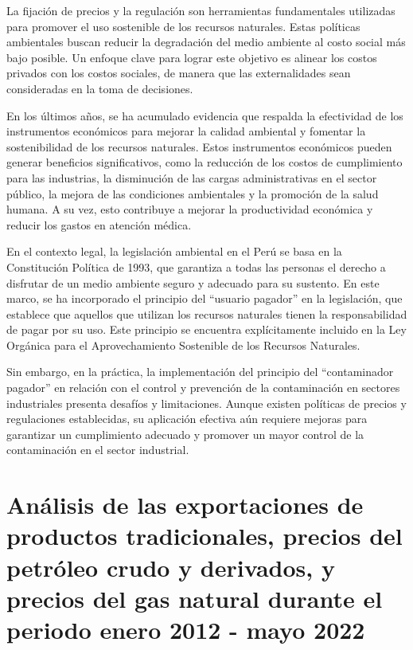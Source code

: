 \documentclass[
  stu,
  floatsintext,
  longtable,
  a4paper,
  nolmodern,
  notxfonts,
  notimes,
  12pt,
  colorlinks=true,linkcolor=blue,citecolor=blue,urlcolor=blue]{apa7}
\begin{document}
La fijación de precios y la regulación son herramientas fundamentales
utilizadas para promover el uso sostenible de los recursos naturales.
Estas políticas ambientales buscan reducir la degradación del medio
ambiente al costo social más bajo posible. Un enfoque clave para lograr
este objetivo es alinear los costos privados con los costos sociales, de
manera que las externalidades sean consideradas en la toma de
decisiones.

En los últimos años, se ha acumulado evidencia que respalda la
efectividad de los instrumentos económicos para mejorar la calidad
ambiental y fomentar la sostenibilidad de los recursos naturales. Estos
instrumentos económicos pueden generar beneficios significativos, como
la reducción de los costos de cumplimiento para las industrias, la
disminución de las cargas administrativas en el sector público, la
mejora de las condiciones ambientales y la promoción de la salud humana.
A su vez, esto contribuye a mejorar la productividad económica y reducir
los gastos en atención médica.

En el contexto legal, la legislación ambiental en el Perú se basa en la
Constitución Política de 1993, que garantiza a todas las personas el
derecho a disfrutar de un medio ambiente seguro y adecuado para su
sustento. En este marco, se ha incorporado el principio del ``usuario
pagador'' en la legislación, que establece que aquellos que utilizan los
recursos naturales tienen la responsabilidad de pagar por su uso. Este
principio se encuentra explícitamente incluido en la Ley Orgánica para
el Aprovechamiento Sostenible de los Recursos Naturales.

Sin embargo, en la práctica, la implementación del principio del
``contaminador pagador'' en relación con el control y prevención de la
contaminación en sectores industriales presenta desafíos y limitaciones.
Aunque existen políticas de precios y regulaciones establecidas, su
aplicación efectiva aún requiere mejoras para garantizar un cumplimiento
adecuado y promover un mayor control de la contaminación en el sector
industrial.

\section{Análisis de las exportaciones de productos tradicionales,
precios del petróleo crudo y derivados, y precios del gas natural
durante el periodo enero 2012 - mayo
2022}\label{anuxe1lisis-de-las-exportaciones-de-productos-tradicionales-precios-del-petruxf3leo-crudo-y-derivados-y-precios-del-gas-natural-durante-el-periodo-enero-2012---mayo-2022}
\end{document}
